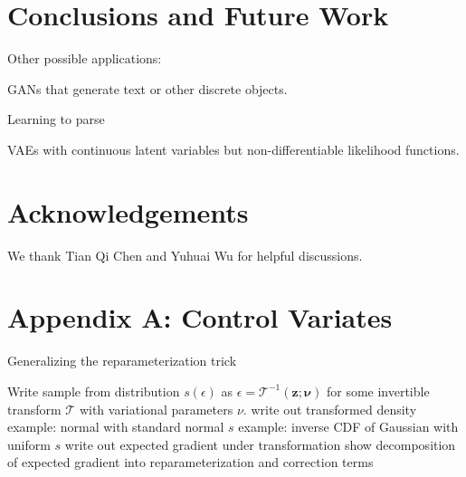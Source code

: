 \documentclass{article}
\begin{document}
\section{Conclusions and Future Work}
\label{conclusion}

Other possible applications:

GANs \citep{goodfellow2014generative} that generate text or other discrete objects.

Learning to parse \citep{kusner2017grammar}

VAEs with continuous latent variables but non-differentiable likelihood functions.


\section*{Acknowledgements}
We thank Tian Qi Chen and Yuhuai Wu for helpful discussions.







\section{Appendix A: Control Variates}




\par{Generalizing the reparameterization trick}

Write sample from distribution $s(\epsilon)$ as $\epsilon = \mathcal{T}^{-1}(\mathbf{z}; \mathbf{\nu})$ for some invertible transform $\mathcal{T}$ with variational parameters $\nu$.
write out transformed density
example: normal with standard normal $s$
example: inverse CDF of Gaussian with uniform $s$
write out expected gradient under transformation
show decomposition of expected gradient into reparameterization and correction terms 
\end{document}
